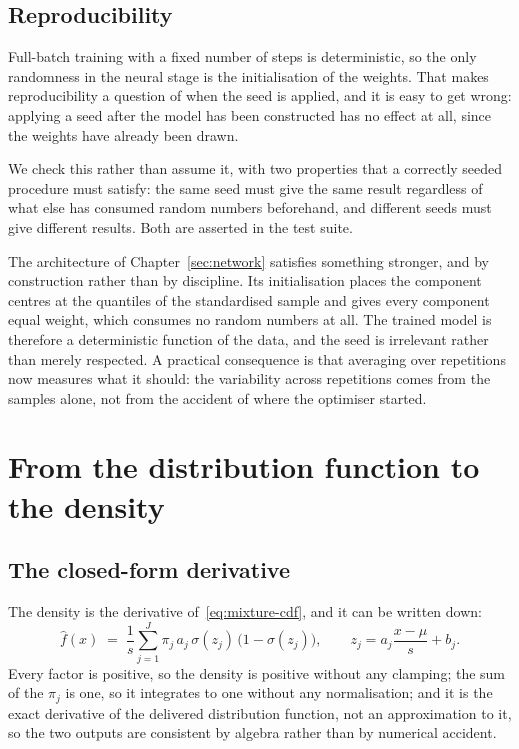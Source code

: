 \documentclass[11pt]{article}
\newcommand{\fhat}{\widehat{f}}
\begin{document}
\subsection{Reproducibility}
\label{sec:reproducibility}

Full-batch training with a fixed number of steps is deterministic, so the only randomness in
the neural stage is the initialisation of the weights. That makes reproducibility a question
of when the seed is applied, and it is easy to get wrong: applying a seed after the model has
been constructed has no effect at all, since the weights have already been drawn.

We check this rather than assume it, with two properties that a correctly seeded procedure
must satisfy: the same seed must give the same result regardless of what else has consumed
random numbers beforehand, and different seeds must give different results. Both are asserted
in the test suite.

The architecture of Chapter~\ref{sec:network} satisfies something stronger, and by
construction rather than by discipline. Its initialisation places the component centres at
the quantiles of the standardised sample and gives every component equal weight, which
consumes no random numbers at all. The trained model is therefore a deterministic function of
the data, and the seed is irrelevant rather than merely respected. A practical consequence is
that averaging over repetitions now measures what it should: the variability across
repetitions comes from the samples alone, not from the accident of where the optimiser
started.

\section{From the distribution function to the density}
\label{sec:density}

\subsection{The closed-form derivative}

The density is the derivative of~\eqref{eq:mixture-cdf}, and it can be written down:
\begin{equation}
\fhat(x) \;=\; \frac{1}{s} \sum_{j=1}^{J} \pi_j\, a_j\, \sigma(z_j)\,\big(1 - \sigma(z_j)\big),
\qquad z_j = a_j \frac{x - \mu}{s} + b_j .
\label{eq:mixture-pdf}
\end{equation}
Every factor is positive, so the density is positive without any clamping; the sum of the
$\pi_j$ is one, so it integrates to one without any normalisation; and it is the exact
derivative of the delivered distribution function, not an approximation to it, so the two
outputs are consistent by algebra rather than by numerical accident.
\end{document}
